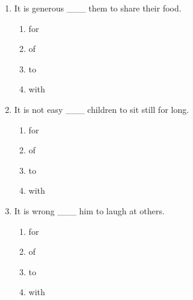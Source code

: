 \documentclass[11pt,a4paper]{ctexart}
\begin{document}
\begin{enumerate}[leftmargin=*,itemsep=4pt]
\begin{enumerate}[label=\Alph*.,leftmargin=2em,itemsep=1pt,topsep=2pt]
\item with
\end{enumerate}
\item It is generous \_\_\_ them to share their food.
\begin{enumerate}[label=\Alph*.,leftmargin=2em,itemsep=1pt,topsep=2pt]
\item for
\item of
\item to
\item with
\end{enumerate}
\item It is not easy \_\_\_ children to sit still for long.
\begin{enumerate}[label=\Alph*.,leftmargin=2em,itemsep=1pt,topsep=2pt]
\item for
\item of
\item to
\item with
\end{enumerate}
\item It is wrong \_\_\_ him to laugh at others.
\begin{enumerate}[label=\Alph*.,leftmargin=2em,itemsep=1pt,topsep=2pt]
\item for
\item of
\item to
\item with
\end{enumerate}
\end{enumerate}
\end{document}
